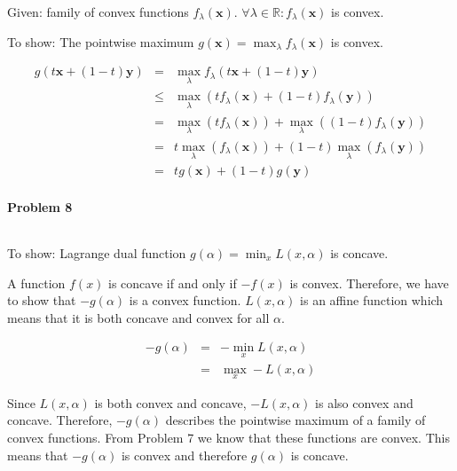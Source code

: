 \documentclass{article}
\renewcommand{\Vec}[1]{\ensuremath{\mathbf{#1}}}
\begin{document}
Given: family of convex functions $f_{\lambda}(\Vec{x})$. $\forall \lambda \in \mathbb{R}: f_{\lambda}(\Vec{x})$ is convex.

To show: The pointwise maximum $g(\Vec{x}) = \max_{\lambda}f_{\lambda}(\Vec{x})$ is convex.

\begin{eqnarray}
g(t\Vec{x} + (1-t)\Vec{y}) &=& \max_{\lambda}f_{\lambda}(t\Vec{x} + (1-t)\Vec{y})\\
&\leq& \max_{\lambda}\left( tf_{\lambda}(\Vec{x}) + (1-t)f_{\lambda}(\Vec{y})\right)\\
&=& \max_{\lambda}\left( tf_{\lambda}(\Vec{x})\right) + \max_{\lambda}\left((1-t)f_{\lambda}(\Vec{y})\right)\\
&=& t\max_{\lambda}\left( f_{\lambda}(\Vec{x})\right) + (1-t)\max_{\lambda}\left(f_{\lambda}(\Vec{y})\right)\\
&=& tg(\Vec{x}) + (1-t)g(\Vec{y})
\end{eqnarray}

\paragraph*{Problem 8}
$\;$ 

To show: Lagrange dual function $g(\alpha) = \min_x L(x,\alpha)$ is concave.

A function $f(x)$ is concave if and only if $-f(x)$ is convex. Therefore, we have to show that $-g(\alpha)$ is a convex function. $L(x, \alpha)$ is an affine function which means that it is both concave and convex for all $\alpha$.

\begin{eqnarray}
-g(\alpha) &=& -\min_x L(x,\alpha)\\
&=& \max_x -L(x,\alpha)
\end{eqnarray}

Since $L(x, \alpha)$ is both convex and concave, $-L(x, \alpha)$ is also convex and concave. Therefore, $-g(\alpha)$ describes the pointwise maximum of a family of convex functions. From Problem 7 we know that these functions are convex. This means that $-g(\alpha)$ is convex and therefore $g(\alpha)$ is concave.
\end{document}
